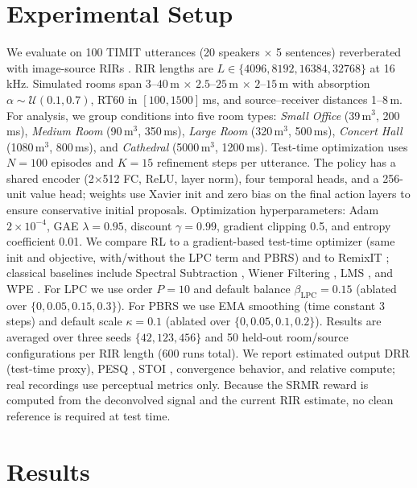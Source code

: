 \documentclass[10pt,conference]{IEEEtran}
\begin{document}
\section{Experimental Setup}

We evaluate on 100 TIMIT utterances \cite{garofolo1993timit} (20 speakers $\times$ 5 sentences) reverberated with image-source RIRs \cite{allen1979image}. RIR lengths are $L\in\{4096,8192,16384,32768\}$ at 16\,kHz. Simulated rooms span $3$--$40\,$m $\times$ $2.5$--$25\,$m $\times$ $2$--$15\,$m with absorption $\alpha\sim\mathcal{U}(0.1,0.7)$, RT60 in $[100,1500]\,$ms, and source--receiver distances 1--8\,m. For analysis, we group conditions into five room types: \textit{Small Office} (39\,m$^3$, 200\,ms), \textit{Medium Room} (90\,m$^3$, 350\,ms), \textit{Large Room} (320\,m$^3$, 500\,ms), \textit{Concert Hall} (1080\,m$^3$, 800\,ms), and \textit{Cathedral} (5000\,m$^3$, 1200\,ms). Test-time optimization uses $N=100$ episodes and $K=15$ refinement steps per utterance. The policy has a shared encoder (2$\times$512 FC, ReLU, layer norm), four temporal heads, and a 256-unit value head; weights use Xavier init and zero bias on the final action layers to ensure conservative initial proposals. Optimization hyperparameters: Adam $2\times10^{-4}$, GAE $\lambda=0.95$, discount $\gamma=0.99$, gradient clipping 0.5, and entropy coefficient 0.01. We compare RL to a gradient-based test-time optimizer (same init and objective, with/without the LPC term and PBRS) and to RemixIT \cite{9864253}; classical baselines include Spectral Subtraction \cite{boll1979suppression}, Wiener Filtering \cite{lim1979enhancement}, LMS \cite{haykin2008adaptive}, and WPE \cite{nakatani2010speech}. For LPC we use order $P=10$ and default balance \(\beta_{\text{LPC}}=0.15\) (ablated over \(\{0,0.05,0.15,0.3\}\)). For PBRS we use EMA smoothing (time constant 3 steps) and default scale \(\kappa=0.1\) (ablated over \(\{0,0.05,0.1,0.2\}\)). Results are averaged over three seeds \(\{42,123,456\}\) and 50 held-out room/source configurations per RIR length (600 runs total). We report estimated output DRR (test-time proxy), PESQ \cite{rix2001perceptual}, STOI \cite{taal2011algorithm}, convergence behavior, and relative compute; real recordings use perceptual metrics only. Because the SRMR reward is computed from the deconvolved signal and the current RIR estimate, no clean reference is required at test time.

\section{Results}
\end{document}
